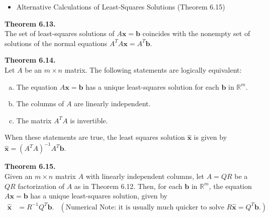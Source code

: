\documentclass[10pt]{book}
\newenvironment{boxthm}{\begin{mdframed}[backgroundcolor=gray!30,nobreak=true]}{\end{mdframed}}
\newenvironment{boxdef}{\begin{mdframed}[backgroundcolor=gray!30,linewidth=0pt,nobreak=true]}{\end{mdframed}}
\newcommand{\R}{\mathbb{R}}
\newcommand{\vect}[1]{\ensuremath{\boldsymbol{\mathbf{#1}}}}
\newcommand{\Axb}{A\vect{x}=\vect{b}}
\newcommand{\xhat}{\hat{\vect{x}}}
\newcommand{\bhat}{\hat{\vect{b}}}
\newcommand{\Axbhat}{A\xhat=\bhat}
\newcommand{\NormEq}{A^TA\vect{x} = A^T\vect{b}}
\begin{document}
\begin{itemize}
\begin{boxdef}
\begin{multicols}{2}
				We can use this to find a solution to $\Axbhat$ without actually computing $\bhat$ as follows:
				\begin{align*}
				A\xhat &= \bhat \\
				A^TA\xhat &= A^T\bhat \\
				A^TA\xhat &= A^T\vect{b} & (\dagger) \\
				\end{align*}
			\end{multicols}
		\vspace{-2.5em}
		\end{boxdef}
		\begin{itemize}
			\item The matrix equation $\NormEq$ represents a system of equations called the \textbf{normal equations} for $\Axb$. A solution to the normal equations $(\dagger)$ is often denoted as $\xhat$.
			\item If $A^TA$ is invertible, $\xhat$ is unique and may be computed directly (Theorem 6.14)
		\end{itemize}
	\item Alternative Calculations of Least-Squares Solutions (Theorem 6.15)
\end{itemize}


\begin{boxthm}
	\textbf{Theorem 6.13.} \\
	The set of least-squares solutions of $\Axb$ coincides with the nonempty set of solutions of the normal equations $\NormEq$.
\end{boxthm}
\vspace{-1ex}
\begin{boxthm}
	\textbf{Theorem 6.14.} \\
	Let $A$ be an $m\times n$ matrix. The following statements are logically equivalent:
	\begin{enumerate}[(a)]\itemsep=0em
		\item The equation $\Axb$ has a unique least-squares solution for each $\vect{b}$ in $\R^m$.
		\item The columns of $A$ are linearly independent.
		\item The matrix $A^TA$ is invertible.
	\end{enumerate}
	When these statements are true, the least squares solution $\xhat$ is given by
	$ \xhat = \left(A^TA\right)^{-1}A^T\vect{b}. $
\end{boxthm}
\vspace{-1ex}
\begin{boxthm}
	\textbf{Theorem 6.15.} \\
	Given an $m\times n$ matrix $A$ with linearly independent columns, let $A=QR$ be a $QR$ factorization of $A$ as in Theorem 6.12. Then, for each $\vect{b}$ in $\R^m$, the equation $\Axb$ has a unique least-squares solution, given by
	\vspace{-1em}
	\begin{align*}
	\xhat &= R^{-1}Q^T\vect{b}. &
	(\text{Numerical Note: it is usually much quicker to solve } R\xhat = Q^T\vect{b}.)
	\end{align*}
\end{boxthm}
\end{document}
